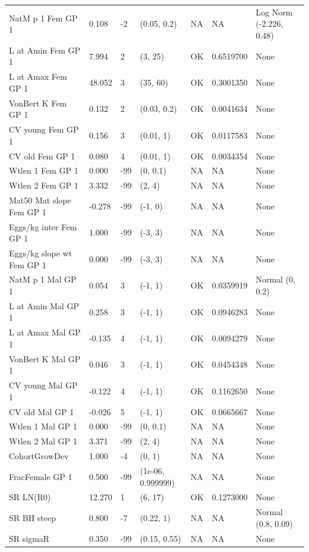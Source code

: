 \documentclass[11pt,
  english,
  a4paper,
]{article}
\begin{document}
\begin{landscape}
\begin{longtable}[t]{>{\raggedright\arraybackslash}p{7cm}lllll>{\raggedright\arraybackslash}p{4cm}}
\endfoot
\bottomrule
\endlastfoot
NatM p 1 Fem GP 1 & 0.108 & -2 & (0.05, 0.2) & NA & NA & Log Norm (-2.226, 0.48)\\
L at Amin Fem GP 1 & 7.994 & 2 & (3, 25) & OK & 0.6519700 & None\\
L at Amax Fem GP 1 & 48.052 & 3 & (35, 60) & OK & 0.3001350 & None\\
VonBert K Fem GP 1 & 0.132 & 2 & (0.03, 0.2) & OK & 0.0041634 & None\\
CV young Fem GP 1 & 0.156 & 3 & (0.01, 1) & OK & 0.0117583 & None\\
CV old Fem GP 1 & 0.080 & 4 & (0.01, 1) & OK & 0.0034354 & None\\
Wtlen 1 Fem GP 1 & 0.000 & -99 & (0, 0.1) & NA & NA & None\\
Wtlen 2 Fem GP 1 & 3.332 & -99 & (2, 4) & NA & NA & None\\
Mat50%
Mat slope Fem GP 1 & -0.278 & -99 & (-1, 0) & NA & NA & None\\
Eggs/kg inter Fem GP 1 & 1.000 & -99 & (-3, 3) & NA & NA & None\\
Eggs/kg slope wt Fem GP 1 & 0.000 & -99 & (-3, 3) & NA & NA & None\\
NatM p 1 Mal GP 1 & 0.054 & 3 & (-1, 1) & OK & 0.0359919 & Normal (0, 0.2)\\
L at Amin Mal GP 1 & 0.258 & 3 & (-1, 1) & OK & 0.0946283 & None\\
L at Amax Mal GP 1 & -0.135 & 4 & (-1, 1) & OK & 0.0094279 & None\\
VonBert K Mal GP 1 & 0.046 & 3 & (-1, 1) & OK & 0.0454348 & None\\
CV young Mal GP 1 & -0.122 & 4 & (-1, 1) & OK & 0.1162650 & None\\
CV old Mal GP 1 & -0.026 & 5 & (-1, 1) & OK & 0.0665667 & None\\
Wtlen 1 Mal GP 1 & 0.000 & -99 & (0, 0.1) & NA & NA & None\\
Wtlen 2 Mal GP 1 & 3.371 & -99 & (2, 4) & NA & NA & None\\
CohortGrowDev & 1.000 & -4 & (0, 1) & NA & NA & None\\
FracFemale GP 1 & 0.500 & -99 & (1e-06, 0.999999) & NA & NA & None\\
SR LN(R0) & 12.270 & 1 & (6, 17) & OK & 0.1273000 & None\\
SR BH steep & 0.800 & -7 & (0.22, 1) & NA & NA & Normal (0.8, 0.09)\\
SR sigmaR & 0.350 & -99 & (0.15, 0.55) & NA & NA & None\\

\end{longtable}
\end{landscape}
\end{document}
